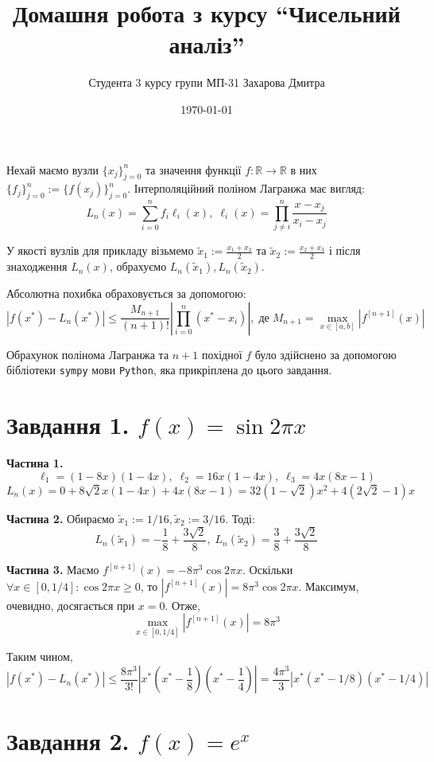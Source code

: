 \documentclass[12pt]{extarticle}
\title{Домашня робота з курсу ``Чисельний аналіз''}
\author{Студента 3 курсу групи МП-31 Захарова Дмитра}
\date{\today}
\begin{document}
\maketitle

Нехай маємо вузли $\{x_j\}_{j=0}^n$ та значення функції $f: \mathbb{R} \to \mathbb{R}$ в них $\{f_j\}_{j=0}^n := \{f(x_j)\}_{j=0}^n$. Інтерполяційний поліном Лагранжа має вигляд:
\[
L_n(x) = \sum_{i=0}^n f_i\ell_i(x), \; \ell_i(x) = \prod_{j \neq i}^n \frac{x-x_j}{x_i-x_j}
\]

У якості вузлів для прикладу візьмемо $\widetilde{x}_1:=\frac{x_1+x_2}{2}$ та $\widetilde{x}_2 := \frac{x_2+x_3}{2}$ і після знаходження $L_n(x)$, обрахуємо $L_n(\widetilde{x}_1),L_n(\widetilde{x}_2)$.

Абсолютна похибка обраховується за допомогою:
\[
|f(x^*) - L_n(x^*)| \leq \frac{M_{n+1}}{(n+1)!}\left|\prod_{i=0}^n (x^*-x_i)\right|, \; \text{де} \; M_{n+1} = \max_{x \in [a,b]}\left|f^{[n+1]}(x)\right|
\]

Обрахунок полінома Лагранжа та $n+1$ похідної $f$ було здійснено за допомогою бібліотеки \texttt{sympy} мови \texttt{Python}, яка прикріплена до цього завдання.

\section*{Завдання 1. $f(x) = \sin 2\pi x$}  

\textbf{Частина 1.} 
\[
\ell_1 = (1 - 8x)(1 - 4x), \; \ell_2 = 16x(1-4x), \; \ell_3 = 4x(8x-1)
\]
\[
L_n(x) = 0 + 8\sqrt{2}x(1-4x) + 4x(8x-1) = 32(1-\sqrt{2})x^2 + 4(2\sqrt{2} - 1)x
\]

\textbf{Частина 2.} Обираємо $\widetilde{x}_1 := 1/16, \widetilde{x}_2 := 3/16$. Тоді:
\[
L_n(\widetilde{x}_1) = -\frac{1}{8} + \frac{3\sqrt{2}}{8}, \; L_n(\widetilde{x}_2) = \frac{3}{8} + \frac{3\sqrt{2}}{8}
\]

\textbf{Частина 3.} Маємо $f^{[n+1]}(x) = -8\pi^3 \cos 2\pi x$. Оскільки $\forall x \in [0,1/4]: \cos 2\pi x \geq 0$, то $|f^{[n+1]}(x)| = 8\pi^3 \cos 2\pi x$. Максимум, очевидно, досягається при $x=0$. Отже, 
\[
\max_{x \in [0,1/4]} |f^{[n+1]}(x)| = 8\pi^3
\]

Таким чином,
\[
|f(x^*)-L_n(x^*)| \leq \frac{8\pi^3}{3!}\left|x^*\left(x^*-\frac{1}{8}\right)\left(x^*-\frac{1}{4}\right)\right| = \frac{4\pi^3}{3}|x^*(x^*-1/8)(x^*-1/4)|
\]

\section*{Завдання 2. $f(x) = e^x$}
\end{document}

